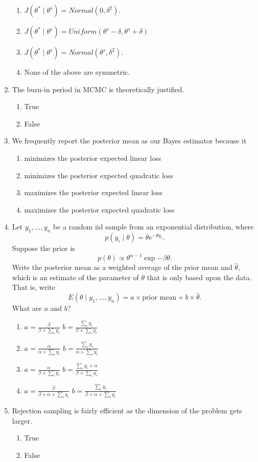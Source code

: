 \documentclass[12pt]{article}
\begin{document}
\begin{enumerate}
\begin{enumerate}
\item $J(\theta^*\mid \theta^{s}) = Normal(0, \delta^2).$
\item $J(\theta^*\mid \theta^{s}) = Uniform(\theta^{s} - \delta, \theta^{s} + \delta)$
\item $J(\theta^*\mid \theta^{s})  = Normal(\theta^{s}, \delta^2).$
\item None of the above are symmetric.
\end{enumerate}
\item The burn-in period in MCMC is theoretically justified.
\begin{enumerate}
\item True
\item False
\end{enumerate}
\item We frequently report the posterior mean as our Bayes estimator because it
\begin{enumerate}
\item minimizes the posterior expected linear loss
\item minimizes the posterior expected quadratic loss
\item maximizes the posterior expected linear loss
\item maximizes the posterior expected quadratic loss
\end{enumerate}
\item Let $y_1,\ldots, y_n$ be a random iid sample from an exponential distribution, where $$p(y_i \mid \theta) = \theta e^{-\theta y_i}.$$ Suppose the prior is 
$$p(\theta) \propto \theta^{\alpha-1} \exp{-\beta \theta}. $$
Write the posterior mean as a weighted average of the prior mean and $\hat{\theta}$, which is an estimate of the parameter of $\theta$ that is only based upon the data. That is, write 
$$E(\theta \mid y_1,\ldots, y_n) = a \times \text{prior mean} + b \times \hat{\theta}.$$
What are $a$ and $b$?
\begin{enumerate}
\item $a=\frac{\beta}{\beta + \sum_i y_i}$  \quad $b=\frac{ \sum_i y_i}{\beta + \sum_i y_i}$ 
\item $a=\frac{\alpha}{\alpha+ \sum_i y_i}$  \quad $b=\frac{ \sum_i y_i}{\alpha + \sum_i y_i}$ 
\item  $a=\frac{\alpha}{\beta+ \sum_i y_i}$  \quad $b=\frac{ \sum_i y_i + \alpha}{\beta + \sum_i y_i}$ 
\item $a=\frac{\beta}{\beta + \alpha +  \sum_i y_i}$  \quad $b=\frac{ \sum_i y_i}{\beta + \alpha + \sum_i y_i}$ 
\end{enumerate}
\item Rejection sampling is fairly efficient as the dimension of the problem gets larger.
\begin{enumerate}
\item True
\item False
\end{enumerate}
\end{enumerate}
\end{document}
